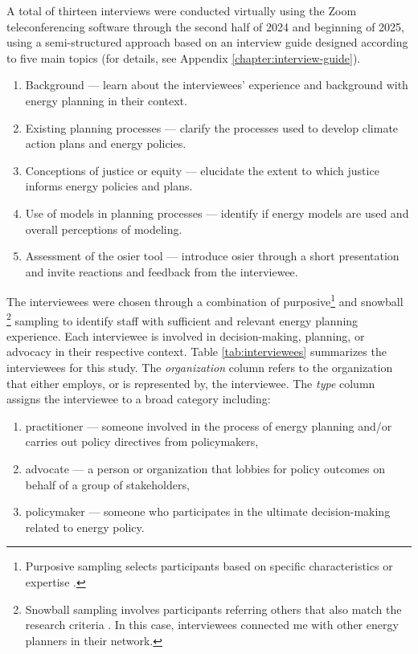 A total of thirteen interviews were conducted virtually using the Zoom
teleconferencing software through the second half of 2024 and beginning of 2025,
using a semi-structured approach based on an interview guide designed according
to five main topics (for details, see Appendix \ref{chapter:interview-guide}).
\begin{enumerate}
    \item Background --- learn about the interviewees' experience and background
    with energy planning in their context.
    \item Existing planning processes --- clarify the processes used to develop
    climate action plans and energy policies.
    \item Conceptions of justice or equity --- elucidate the extent to which
    justice informs energy policies and plans.
    \item Use of models in planning processes --- identify if energy models are
    used and overall perceptions of modeling.
    \item Assessment of the \ac{osier} tool --- introduce \ac{osier} through a
    short presentation and invite reactions and feedback from the interviewee.
\end{enumerate}
The interviewees were chosen through a combination of
purposive\footnote{Purposive sampling selects participants based on specific
characteristics or expertise \cite{ahmed_how_2024}.} and snowball
\footnote{Snowball sampling involves participants referring others that also
match the research criteria \cite{ahmed_how_2024}. In this case, interviewees
connected me with other energy planners in their network.} sampling to identify
staff with sufficient and relevant energy planning experience. Each interviewee
is involved in decision-making, planning, or advocacy in their respective
context. Table \ref{tab:interviewees} summarizes the interviewees for this
study. The \textit{organization} column refers to the organization that either
employs, or is represented by, the interviewee. The \textit{type} column assigns
the interviewee to a broad category including:
\begin{enumerate}
    \item practitioner --- someone involved in the process of energy planning
    and/or carries out policy directives from policymakers,
    \item advocate --- a person or organization that lobbies for policy outcomes
    on behalf of a group of stakeholders,
    \item policymaker --- someone who participates in the ultimate
    decision-making related to energy policy.
\end{enumerate}
    
